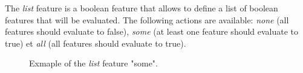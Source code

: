 \documentclass[manual-fr.tex]{subfiles}
\begin{document}
The \textit{list} feature is a boolean feature that allows to define a list of boolean features that will be evaluated. The following actions are available: \textit{none} (all features should evaluate to false), \textit{some} (at least one feature should evaluate to true) et \textit{all} (all features should evaluate to true).

\begin{figure}[ht!]
\footnotesize
\begin{xml}
\end{xml}
\caption{Exmaple of the \textit{list} feature "some".}
\label{fig:feature-list-some}
\end{figure}
\end{document}
